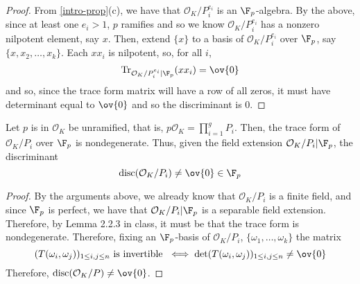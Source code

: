 \documentclass[11pt,leqno,oneside]{amsart}
\numberwithin{thm}{section}
\renewcommand{\O}{\mathcal{O}}
\newcommand{\disc}{\operatorname{disc}}
\newcommand{\Tr}{\operatorname{Tr}}
\begin{document}
\begin{proof}
  From \ref{intro-prop}(c), we have that \(\O_K/P_i^{e_i}\) is an
  \(\F_p\)-algebra. By the above, since at least one \(e_i>1\), \(p\)
  ramifies and so we know \(\O_K/P_i^{e_i}\) has a nonzero nilpotent
  element, 
  say \(x\). Then, extend \(\{x\}\) to a basis of \(\O_K/P_i^{e_i}\)
  over \(\F_p\), say \(\{x,x_2, \ldots,
  x_k\}\). Each \(xx_i\) is nilpotent, so, for all \(i\), \[
    \Tr_{\O_K/P_i^{e_i}|\F_p}(xx_i) = \ov{0}
  \]
  and so, since the trace form matrix will have a row of all zeros, it
  must have determinant equal to \(\ov{0}\) and so the discriminant is
  \(0\). 
\end{proof}
\begin{lem}\label{trace-form-nondeg-on-field-ext}
  Let \(p\) is in \(\O_K\) be unramified, that is, \(p \O_K =
  \prod_{i=1}^g P_i\). Then, the trace 
  form of \(\O_K/P_i\) over 
  \(\F_p\) is nondegenerate. Thus, given the field extension
  \(\O_K/P_i|\F_p\), the discriminant \[
    \disc(\O_K/P_i) \neq \ov{0} \in \F_p
  \]
\end{lem}
\begin{proof}
  By the arguments above, we already know that \(\O_K/P_i\) is a
  finite field, and since \(\F_p\) is perfect, we have that
  \(\O_K/P_i|\F_p\) is a separable field extension. Therefore, by
  Lemma 2.2.3 in class, it must be that the trace form is
  nondegenerate. Therefore, fixing an \(\F_p\)-basis of \(\O_K/P_i\),
  \(\{\omega_1, \ldots, \omega_k\}\)
  the matrix \[
    (T(\omega_i,\omega_j))_{1 \leq i,j \leq n} \text{ is invertible }  \iff
    \det(T(\omega_i,\omega_j))_{1 \leq i,j \leq n} \neq \ov{0}
  \]
  Therefore, \(\disc(\O_K/P) \neq \ov{0}\).
\end{proof}
\end{document}
